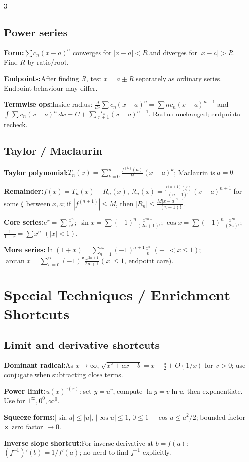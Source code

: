 \documentclass[10pt]{article}
\newcommand{\e}{\mathrm e}
\newcommand{\dx}{\,dx}
\newenvironment{cheatitems}{\par\vspace{-2pt}}{\par\vspace{-2pt}}
\newcommand{\cheatrow}[2]{%
  \par\noindent\textbf{#1:}\nobreak\hspace{0.25em}#2\par
}
\begin{document}
\begin{multicols}{3}
\subsection*{Power series}
\begin{cheatitems}
\cheatrow{Form}{$\sum c_n(x-a)^n$ converges for $|x-a|<R$ and diverges for $|x-a|>R$. Find $R$ by ratio/root.}
\cheatrow{Endpoints}{After finding $R$, test $x=a\pm R$ separately as ordinary series. Endpoint behaviour may differ.}
\cheatrow{Termwise ops}{Inside radius: $\frac{d}{dx}\sum c_n(x-a)^n=\sum n c_n(x-a)^{n-1}$ and $\int\sum c_n(x-a)^n\dx=C+\sum\frac{c_n}{n+1}(x-a)^{n+1}$. Radius unchanged; endpoints recheck.}
\end{cheatitems}

\subsection*{Taylor / Maclaurin}
\begin{cheatitems}
\cheatrow{Taylor polynomial}{$T_n(x)\!=\!\sum_{k=0}^{n}\!\frac{f^{(k)}(a)}{k!}(x-a)^k$; Maclaurin is $a=0$.}
\vspace{-2pt}
\cheatrow{Remainder}{$f(x)=T_n(x)+R_n(x)$, $R_n(x)=\frac{f^{(n+1)}(\xi)}{(n+1)!}(x-a)^{n+1}$ for some $\xi$ between $x,a$; if $|f^{(n+1)}|\le M$, then $|R_n|\le\frac{M|x-a|^{n+1}}{(n+1)!}$.}
\vspace{-2pt}
\cheatrow{Core series}{$\e^x=\sum\frac{x^n}{n!}$; $\sin x=\sum(-1)^n\frac{x^{2n+1}}{(2n+1)!}$; $\cos x=\sum(-1)^n\frac{x^{2n}}{(2n)!}$; $\frac1{1-x}=\sum x^n$ $(|x|<1)$.}
\vspace{-2pt}
\cheatrow{More series}{$\ln(1+x)=\sum_{n=1}^{\infty}(-1)^{n+1}\frac{x^n}{n}$ $(-1<x\le1)$; $\arctan x=\sum_{n=0}^{\infty}(-1)^n\frac{x^{2n+1}}{2n+1}$ $(|x|\le1$, endpoint care).}
\end{cheatitems}


\section*{Special Techniques / Enrichment Shortcuts}

\subsection*{Limit and derivative shortcuts}
\begin{cheatitems}
\cheatrow{Dominant radical}{As $x\to\infty$, $\sqrt{x^2+ax+b}\!=\!x+\frac a2+O(1/x)$ for $x>0$; use conjugate when subtracting close terms.}
\cheatrow{Power limit}{$u(x)^{v(x)}$: set $y\!=\!u^v$, compute $\ln y\!=\!v\ln u$, then exponentiate. Use for $1^\infty,0^0,\infty^0$.}
\cheatrow{Squeeze forms}{$|\sin u|\le |u|$, $|\cos u|\le1$, $0\le1-\cos u\le u^2/2$; bounded factor $\times$ zero factor $\to0$.}
\cheatrow{Inverse slope shortcut}{For inverse derivative at $b\!=\!f(a)$: $(f^{-1})'(b)\!=\!1/f'(a)$; no need to find $f^{-1}$ explicitly.}
\end{cheatitems}


\end{multicols}
\end{document}
